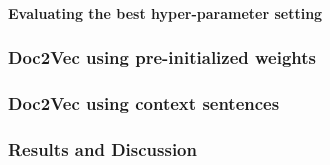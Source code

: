 \paragraph{Evaluating the best hyper-parameter setting}

\subsubsection{Doc2Vec using pre-initialized weights}

\subsubsection{Doc2Vec using context sentences}

\subsubsection{Results and Discussion}

